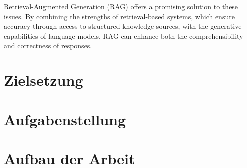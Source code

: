 Retrieval-Augmented Generation (RAG) offers a promising solution to these issues. 
By combining the strengths of retrieval-based systems, which ensure accuracy through access to structured knowledge sources, with the generative capabilities of language models, RAG can enhance both the comprehensibility and correctness of responses. 

\section{Zielsetzung}\label{sec:zielsetzung}


\section{Aufgabenstellung}



\section{Aufbau der Arbeit}

